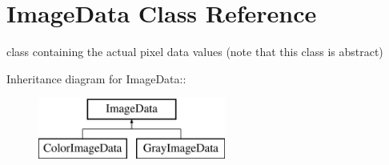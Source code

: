 \section{Image\-Data Class Reference}
\label{class_c_s_image_viewer_1_1_image_data}
class containing the actual pixel data values (note that this class is abstract)  


Inheritance diagram for Image\-Data::\begin{figure}[H]
\begin{center}
\leavevmode
\includegraphics[height=2cm]{class_c_s_image_viewer_1_1_image_data}
\end{center}
\end{figure}
